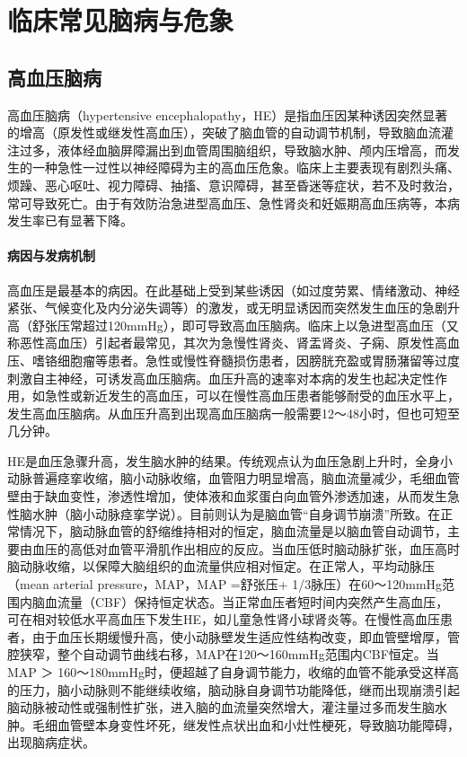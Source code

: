 \part{临床常见脑病与危象}

\chapter{高血压脑病}

高血压脑病（hypertensive
encephalopathy，HE）是指血压因某种诱因突然显著的增高（原发性或继发性高血压），突破了脑血管的自动调节机制，导致脑血流灌注过多，液体经血脑屏障漏出到血管周围脑组织，导致脑水肿、颅内压增高，而发生的一种急性一过性以神经障碍为主的高血压危象。临床上主要表现有剧烈头痛、烦躁、恶心呕吐、视力障碍、抽搐、意识障碍，甚至昏迷等症状，若不及时救治，常可导致死亡。由于有效防治急进型高血压、急性肾炎和妊娠期高血压病等，本病发生率已有显著下降。

\subsection{病因与发病机制}

高血压是最基本的病因。在此基础上受到某些诱因（如过度劳累、情绪激动、神经紧张、气候变化及内分泌失调等）的激发，或无明显诱因而突然发生血压的急剧升高（舒张压常超过120mmHg），即可导致高血压脑病。临床上以急进型高血压（又称恶性高血压）引起者最常见，其次为急慢性肾炎、肾盂肾炎、子痫、原发性高血压、嗜铬细胞瘤等患者。急性或慢性脊髓损伤患者，因膀胱充盈或胃肠潴留等过度刺激自主神经，可诱发高血压脑病。血压升高的速率对本病的发生也起决定性作用，如急性或新近发生的高血压，可以在慢性高血压患者能够耐受的血压水平上，发生高血压脑病。从血压升高到出现高血压脑病一般需要12～48小时，但也可短至几分钟。

HE是血压急骤升高，发生脑水肿的结果。传统观点认为血压急剧上升时，全身小动脉普遍痉挛收缩，脑小动脉收缩，血管阻力明显增高，脑血流量减少，毛细血管壁由于缺血变性，渗透性增加，使体液和血浆蛋白向血管外渗透加速，从而发生急性脑水肿（脑小动脉痉挛学说）。目前则认为是脑血管“自身调节崩溃”所致。在正常情况下，脑动脉血管的舒缩维持相对的恒定，脑血流量是以脑血管自动调节，主要由血压的高低对血管平滑肌作出相应的反应。当血压低时脑动脉扩张，血压高时脑动脉收缩，以保障大脑组织的血流量供应相对恒定。在正常人，平均动脉压（mean
arterial pressure，MAP，MAP =舒张压+
1/3脉压）在60～120mmHg范围内脑血流量（CBF）保持恒定状态。当正常血压者短时间内突然产生高血压，可在相对较低水平高血压下发生HE，如儿童急性肾小球肾炎等。在慢性高血压患者，由于血压长期缓慢升高，使小动脉壁发生适应性结构改变，即血管壁增厚，管腔狭窄，整个自动调节曲线右移，MAP在120～160mmHg范围内CBF恒定。当MAP
＞
160～180mmHg时，便超越了自身调节能力，收缩的血管不能承受这样高的压力，脑小动脉则不能继续收缩，脑动脉自身调节功能降低，继而出现崩溃引起脑动脉被动性或强制性扩张，进入脑的血流量突然增大，灌注量过多而发生脑水肿。毛细血管壁本身变性坏死，继发性点状出血和小灶性梗死，导致脑功能障碍，出现脑病症状。

